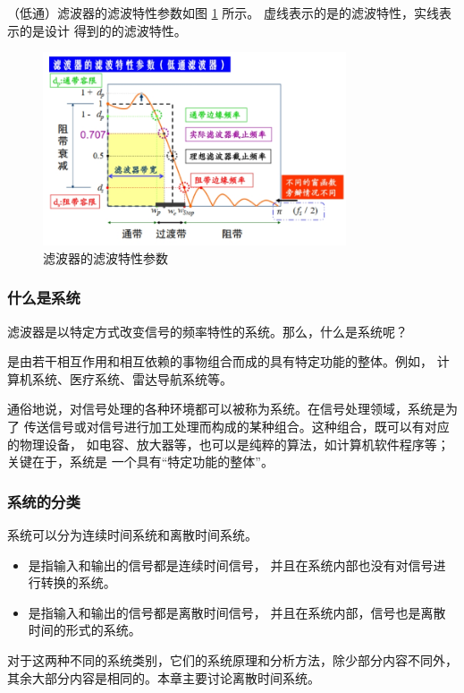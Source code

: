 \begin{property}[滤波器的滤波特性参数]
    （低通）滤波器的滤波特性参数如图 \ref{fig:filter-characteristics} 所示。
    虚线表示的是的滤波特性，实线表示的是设计
    得到的的滤波特性。
    \begin{figure}[H]
        \centering
        \includegraphics[width=0.8\textwidth]{chap4/img/filter_characteristics.png}
        \caption{滤波器的滤波特性参数}
        \label{fig:filter-characteristics}
    \end{figure}
\end{property}

\subsubsection{什么是系统}

滤波器是以特定方式改变信号的频率特性的系统。那么，什么是系统呢？

\begin{definition}[系统]
    是由若干相互作用和相互依赖的事物组合而成的具有特定功能的整体。例如，
    计算机系统、医疗系统、雷达导航系统等。

    通俗地说，对信号处理的各种环境都可以被称为系统。在信号处理领域，系统是为了
    传送信号或对信号进行加工处理而构成的某种组合。这种组合，既可以有对应的物理设备，
    如电容、放大器等，也可以是纯粹的算法，如计算机软件程序等；关键在于，系统是
    一个具有``特定功能的整体''。
\end{definition}

\subsubsection{系统的分类}

\begin{definition}[连续时间系统与离散时间系统]
    系统可以分为连续时间系统和离散时间系统。
    \begin{itemize}
        \item {}是指输入和输出的信号都是连续时间信号，
            并且在系统内部也没有对信号进行转换的系统。
        \item {}是指输入和输出的信号都是离散时间信号，
            并且在系统内部，信号也是离散时间的形式的系统。
    \end{itemize}
    
    对于这两种不同的系统类别，它们的系统原理和分析方法，除少部分内容不同外，
    其余大部分内容是相同的。本章主要讨论离散时间系统。
\end{definition}

